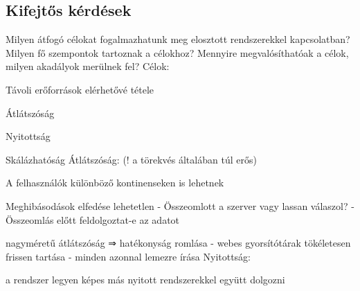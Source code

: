 \documentclass[12pt]{article}
\begin{document}
                                                                \subsection{Kifejtős kérdések}
                                                                \begin{description}
                                                                    \item  Milyen átfogó célokat fogalmazhatunk meg elosztott rendszerekkel kapcsolatban? Milyen fő szempontok tartoznak a célokhoz? Mennyire megvalósíthatóak a célok, milyen akadályok merülnek fel?
                                                                        Célok:
                                                                    \item Távoli erőforrások elérhetővé tétele
                                                                    \item Átlátszóság
                                                                    \item Nyitottság
                                                                    \item Skálázhatóság
                                                                        Átlátszóság: (! a törekvés általában túl erős)
                                                                    \item A felhasználók különböző kontinenseken is lehetnek 
                                                                    \item Meghibásodások elfedése lehetetlen
                                                                        - Összeomlott a szerver vagy lassan válaszol? 
                                                                        - Összeomlás előtt feldolgoztat-e az adatot
                                                                    \item nagyméretű átlátszóság ⇒ hatékonyság romlása
                                                                        - webes gyorsítótárak tökéletesen frissen tartása
                                                                        - minden azonnal lemezre írása
                                                                        Nyitottság: 
                                                                    \item a rendszer legyen képes más nyitott rendszerekkel együtt dolgozni

\end{description}
\end{document}
